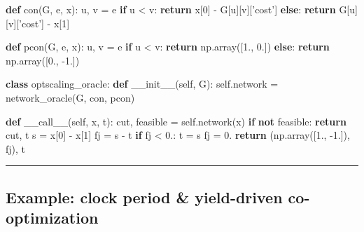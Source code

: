 \documentclass[]{article}
\newenvironment{Shaded}{}{}
\newcommand{\ControlFlowTok}[1]{\textcolor[rgb]{0.00,0.44,0.13}{\textbf{#1}}}
\newcommand{\DecValTok}[1]{\textcolor[rgb]{0.25,0.63,0.44}{#1}}
\newcommand{\FloatTok}[1]{\textcolor[rgb]{0.25,0.63,0.44}{#1}}
\newcommand{\FunctionTok}[1]{\textcolor[rgb]{0.02,0.16,0.49}{#1}}
\newcommand{\KeywordTok}[1]{\textcolor[rgb]{0.00,0.44,0.13}{\textbf{#1}}}
\newcommand{\NormalTok}[1]{#1}
\newcommand{\OperatorTok}[1]{\textcolor[rgb]{0.40,0.40,0.40}{#1}}
\newcommand{\StringTok}[1]{\textcolor[rgb]{0.25,0.44,0.63}{#1}}
\newcommand{\VariableTok}[1]{\textcolor[rgb]{0.10,0.09,0.49}{#1}}
\begin{document}
\begin{Shaded}
\begin{Highlighting}[]
\KeywordTok{def}\NormalTok{ con(G, e, x):}
\NormalTok{    u, v }\OperatorTok{=}\NormalTok{ e}
    \ControlFlowTok{if}\NormalTok{ u }\OperatorTok{<}\NormalTok{ v: }\ControlFlowTok{return}\NormalTok{ x[}\DecValTok{0}\NormalTok{] }\OperatorTok{-}\NormalTok{ G[u][v][}\StringTok{'cost'}\NormalTok{]}
    \ControlFlowTok{else}\NormalTok{: }\ControlFlowTok{return}\NormalTok{ G[u][v][}\StringTok{'cost'}\NormalTok{] }\OperatorTok{-}\NormalTok{ x[}\DecValTok{1}\NormalTok{]}

\KeywordTok{def}\NormalTok{ pcon(G, e, x):}
\NormalTok{    u, v }\OperatorTok{=}\NormalTok{ e}
    \ControlFlowTok{if}\NormalTok{ u }\OperatorTok{<}\NormalTok{ v: }\ControlFlowTok{return}\NormalTok{ np.array([}\FloatTok{1.}\NormalTok{, }\FloatTok{0.}\NormalTok{])}
    \ControlFlowTok{else}\NormalTok{: }\ControlFlowTok{return}\NormalTok{ np.array([}\FloatTok{0.}\NormalTok{, }\FloatTok{-1.}\NormalTok{])}

\KeywordTok{class}\NormalTok{ optscaling_oracle:}
    \KeywordTok{def} \FunctionTok{__init__}\NormalTok{(}\VariableTok{self}\NormalTok{, G):}
        \VariableTok{self}\NormalTok{.network }\OperatorTok{=}\NormalTok{ network_oracle(G, con, pcon)}

    \KeywordTok{def} \FunctionTok{__call__}\NormalTok{(}\VariableTok{self}\NormalTok{, x, t):}
\NormalTok{        cut, feasible }\OperatorTok{=} \VariableTok{self}\NormalTok{.network(x)}
        \ControlFlowTok{if} \KeywordTok{not}\NormalTok{ feasible: }\ControlFlowTok{return}\NormalTok{ cut, t}
\NormalTok{        s }\OperatorTok{=}\NormalTok{ x[}\DecValTok{0}\NormalTok{] }\OperatorTok{-}\NormalTok{ x[}\DecValTok{1}\NormalTok{]}
\NormalTok{        fj }\OperatorTok{=}\NormalTok{ s }\OperatorTok{-}\NormalTok{ t}
        \ControlFlowTok{if}\NormalTok{ fj }\OperatorTok{<} \FloatTok{0.}\NormalTok{:}
\NormalTok{            t }\OperatorTok{=}\NormalTok{ s}
\NormalTok{            fj }\OperatorTok{=} \FloatTok{0.}
        \ControlFlowTok{return}\NormalTok{ (np.array([}\FloatTok{1.}\NormalTok{, }\FloatTok{-1.}\NormalTok{]), fj), t}
\end{Highlighting}
\end{Shaded}

\begin{center}\rule{0.5\linewidth}{\linethickness}\end{center}

\hypertarget{example-clock-period-yield-driven-co-optimization}{%
\subsection{Example: clock period \& yield-driven
co-optimization}\label{example-clock-period-yield-driven-co-optimization}}
\end{document}

